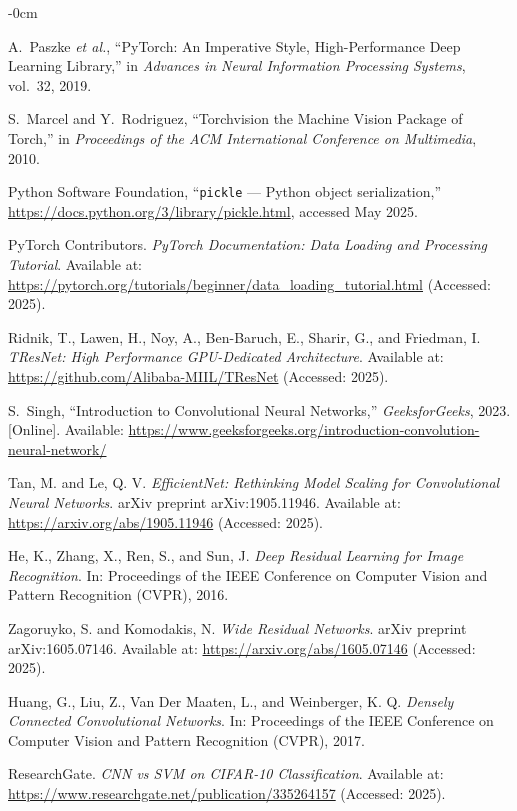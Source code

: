 \documentclass[journal,article,submit,pdftex,moreauthors]{Definitions/mdpi}
\begin{document}
\begin{adjustwidth}{-\extralength}{0cm}
{\begin{thebibliography}{999}
A.~Paszke \emph{et al.}, ``PyTorch: An Imperative Style, High-Performance Deep Learning Library,'' in \emph{Advances in Neural Information Processing Systems}, vol.~32, 2019.

S.~Marcel and Y.~Rodriguez, ``Torchvision the Machine Vision Package of Torch,'' in \emph{Proceedings of the ACM International Conference on Multimedia}, 2010.

Python Software Foundation, ``\texttt{pickle} --- Python object serialization,'' \url{https://docs.python.org/3/library/pickle.html}, accessed May 2025.

PyTorch Contributors. \textit{PyTorch Documentation: Data Loading and Processing Tutorial}. Available at: \url{https://pytorch.org/tutorials/beginner/data_loading_tutorial.html} (Accessed: 2025).

Ridnik, T., Lawen, H., Noy, A., Ben-Baruch, E., Sharir, G., and Friedman, I. \textit{TResNet: High Performance GPU-Dedicated Architecture}. Available at: \url{https://github.com/Alibaba-MIIL/TResNet} (Accessed: 2025).

S.~Singh, ``Introduction to Convolutional Neural Networks,'' \emph{GeeksforGeeks}, 2023. [Online]. Available: \url{https://www.geeksforgeeks.org/introduction-convolution-neural-network/}

Tan, M. and Le, Q. V. \textit{EfficientNet: Rethinking Model Scaling for Convolutional Neural Networks}. arXiv preprint arXiv:1905.11946. Available at: \url{https://arxiv.org/abs/1905.11946} (Accessed: 2025).

He, K., Zhang, X., Ren, S., and Sun, J. \textit{Deep Residual Learning for Image Recognition}. In: Proceedings of the IEEE Conference on Computer Vision and Pattern Recognition (CVPR), 2016.

Zagoruyko, S. and Komodakis, N. \textit{Wide Residual Networks}. arXiv preprint arXiv:1605.07146. Available at: \url{https://arxiv.org/abs/1605.07146} (Accessed: 2025).

Huang, G., Liu, Z., Van Der Maaten, L., and Weinberger, K. Q. \textit{Densely Connected Convolutional Networks}. In: Proceedings of the IEEE Conference on Computer Vision and Pattern Recognition (CVPR), 2017.

ResearchGate. \textit{CNN vs SVM on CIFAR-10 Classification}. Available at: \url{https://www.researchgate.net/publication/335264157} (Accessed: 2025).


\end{thebibliography}}
\end{adjustwidth}
\end{document}
